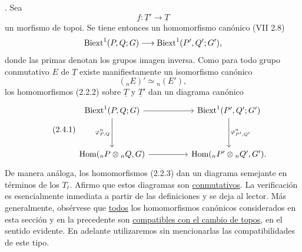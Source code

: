 
\medskip
{}. Sea
\[
 f:\underline T'\longrightarrow\underline T
\]
un morfismo de topoi. Se tiene entonces un homomorfismo canónico
(VII 2.8)
\[
 \operatorname{Biext}^1(P,Q;G)\longrightarrow\operatorname{Biext}^1(P',Q';G'),
\]
donde las primas denotan los grupos imagen inversa. Como para todo
grupo conmutativo $E$ de $\underline T$ existe manifiestamente un
isomorfismo canónico
\[
 ({}_nE)'\simeq{}_n(E'),
\]
los homomorfismos (2.2.2) sobre $\underline T$ y $\underline T'$ dan
un diagrama canónico
\begin{equation}\tag{2.4.1}
\begin{tikzcd}[column sep=huge,row sep=huge]
 \Biext^1(P,Q;G)\arrow[r]\arrow[d,"{\varphi^n_{P,Q}}"']
   &\Biext^1(P',Q';G')\arrow[d,"{\varphi^n_{P',Q'}}"]\\
 \Hom({}_nP\otimes{}_nQ,G)\arrow[r]
   &\Hom({}_nP'\otimes{}_nQ',G').
\end{tikzcd}
\end{equation}
De manera análoga, los homomorfismos (2.2.3) dan un diagrama semejante
en términos de los $T_\ell$. Afirmo que estos diagramas son
\underline{conmutativos}. La verificación es esencialmente inmediata
a partir de las definiciones y se deja al lector. Más generalmente,
obsérvese que \underline{todos} los homomorfismos canónicos
considerados en esta sección y en la precedente son
\underline{compatibles con el cambio de topos}, en el sentido
evidente. En adelante utilizaremos sin mencionarlas las compatibilidades
de este tipo.
